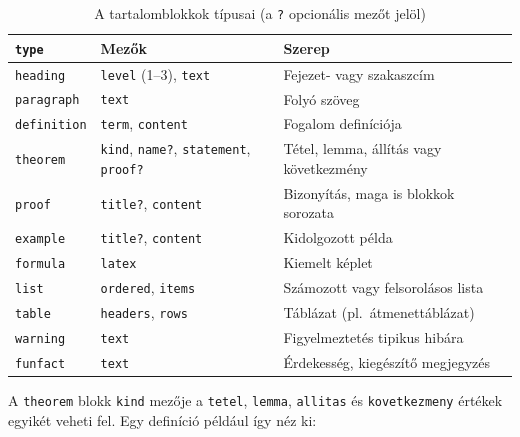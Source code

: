 \begin{table}[H]
    \centering
    \begin{tabularx}{\textwidth}{|l|p{4.6cm}|X|}
        \hline
        \textbf{\texttt{type}} & \textbf{Mezők} & \textbf{Szerep} \\
        \hline
        \texttt{heading}    & \texttt{level} (1--3), \texttt{text}
                            & Fejezet- vagy szakaszcím \\ \hline
        \texttt{paragraph}  & \texttt{text}
                            & Folyó szöveg \\ \hline
        \texttt{definition} & \texttt{term}, \texttt{content}
                            & Fogalom definíciója \\ \hline
        \texttt{theorem}    & \texttt{kind}, \texttt{name?},
                              \texttt{statement}, \texttt{proof?}
                            & Tétel, lemma, állítás vagy következmény \\ \hline
        \texttt{proof}      & \texttt{title?}, \texttt{content}
                            & Bizonyítás, maga is blokkok sorozata \\ \hline
        \texttt{example}    & \texttt{title?}, \texttt{content}
                            & Kidolgozott példa \\ \hline
        \texttt{formula}    & \texttt{latex}
                            & Kiemelt képlet \\ \hline
        \texttt{list}       & \texttt{ordered}, \texttt{items}
                            & Számozott vagy felsorolásos lista \\ \hline
        \texttt{table}      & \texttt{headers}, \texttt{rows}
                            & Táblázat (pl.\ átmenettáblázat) \\ \hline
        \texttt{warning}    & \texttt{text}
                            & Figyelmeztetés tipikus hibára \\ \hline
        \texttt{funfact}    & \texttt{text}
                            & Érdekesség, kiegészítő megjegyzés \\
        \hline
    \end{tabularx}
    \caption{A tartalomblokkok típusai (a \texttt{?} opcionális mezőt jelöl)}
    \label{tab:blocks}
\end{table}

A \texttt{theorem} blokk \texttt{kind} mezője a
\texttt{tetel}, \texttt{lemma}, \texttt{allitas} és
\texttt{kovetkezmeny} értékek egyikét veheti fel. Egy definíció például
így néz ki:

